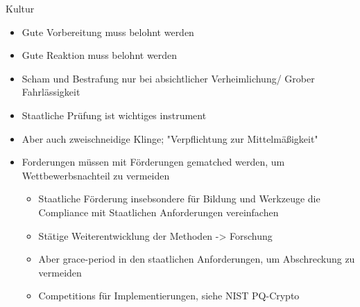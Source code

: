 \begin{frame}{Kultur}
  \begin{itemize}
    \item Gute Vorbereitung muss belohnt werden
    \item Gute Reaktion muss belohnt werden
    \item Scham und Bestrafung nur bei absichtlicher Verheimlichung/ Grober Fahrlässigkeit
    \item Staatliche Prüfung ist wichtiges instrument
    \item Aber auch zweischneidige Klinge; "Verpflichtung zur Mittelmäßigkeit"
    \item Forderungen müssen mit Förderungen gematched werden, um Wettbewerbsnachteil zu vermeiden
    \begin{itemize}
      \item Staatliche Förderung insebsondere für Bildung und Werkzeuge die Compliance mit Staatlichen Anforderungen vereinfachen
      \item Stätige Weiterentwicklung der Methoden -> Forschung
      \item Aber grace-period in den staatlichen Anforderungen, um Abschreckung zu vermeiden\
      \item Competitions für Implementierungen, siehe NIST PQ-Crypto
    \end{itemize}
  \end{itemize}
\end{frame}



